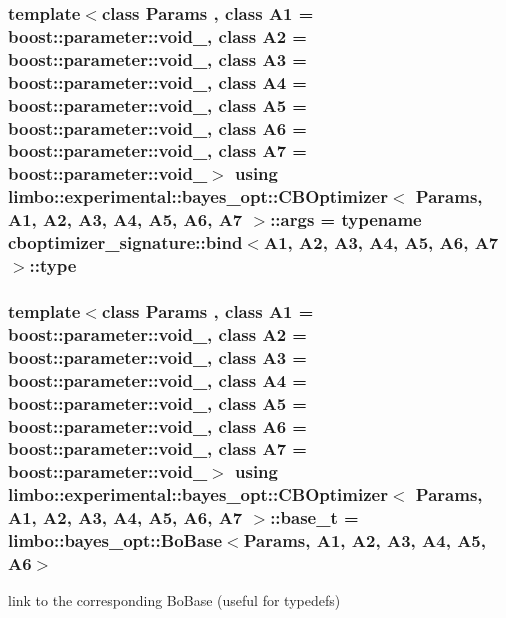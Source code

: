 \subsubsection[{\texorpdfstring{args}{args}}]{\setlength{\rightskip}{0pt plus 5cm}template$<$class Params , class A1  = boost\+::parameter\+::void\+\_\+, class A2  = boost\+::parameter\+::void\+\_\+, class A3  = boost\+::parameter\+::void\+\_\+, class A4  = boost\+::parameter\+::void\+\_\+, class A5  = boost\+::parameter\+::void\+\_\+, class A6  = boost\+::parameter\+::void\+\_\+, class A7  = boost\+::parameter\+::void\+\_\+$>$ using {\bf limbo\+::experimental\+::bayes\+\_\+opt\+::\+C\+B\+Optimizer}$<$ Params, A1, A2, A3, A4, A5, A6, A7 $>$\+::{\bf args} =  typename cboptimizer\+\_\+signature\+::bind$<$A1, A2, A3, A4, A5, A6, A7$>$\+::type}\hypertarget{classlimbo_1_1experimental_1_1bayes__opt_1_1_c_b_optimizer_a0b62d16abcb5eec9dbd4b37222137c26}{}\label{classlimbo_1_1experimental_1_1bayes__opt_1_1_c_b_optimizer_a0b62d16abcb5eec9dbd4b37222137c26}
\subsubsection[{\texorpdfstring{base\+\_\+t}{base_t}}]{\setlength{\rightskip}{0pt plus 5cm}template$<$class Params , class A1  = boost\+::parameter\+::void\+\_\+, class A2  = boost\+::parameter\+::void\+\_\+, class A3  = boost\+::parameter\+::void\+\_\+, class A4  = boost\+::parameter\+::void\+\_\+, class A5  = boost\+::parameter\+::void\+\_\+, class A6  = boost\+::parameter\+::void\+\_\+, class A7  = boost\+::parameter\+::void\+\_\+$>$ using {\bf limbo\+::experimental\+::bayes\+\_\+opt\+::\+C\+B\+Optimizer}$<$ Params, A1, A2, A3, A4, A5, A6, A7 $>$\+::{\bf base\+\_\+t} =  {\bf limbo\+::bayes\+\_\+opt\+::\+Bo\+Base}$<$Params, A1, A2, A3, A4, A5, A6$>$}\hypertarget{classlimbo_1_1experimental_1_1bayes__opt_1_1_c_b_optimizer_a6439aea347906e0e45063d74ee618a29}{}\label{classlimbo_1_1experimental_1_1bayes__opt_1_1_c_b_optimizer_a6439aea347906e0e45063d74ee618a29}


link to the corresponding Bo\+Base (useful for typedefs) 

